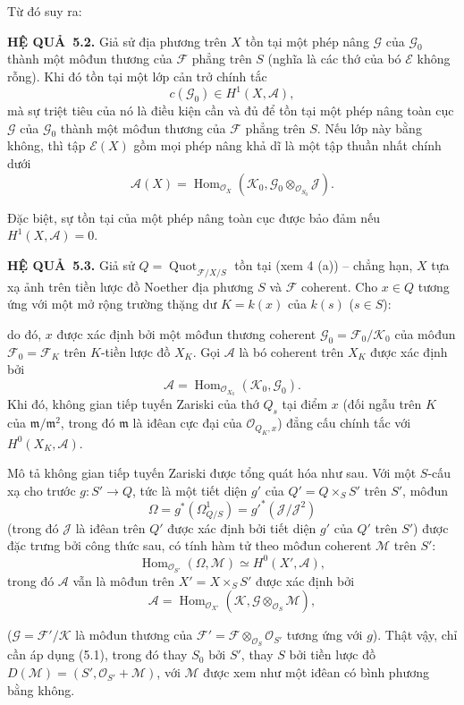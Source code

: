 \documentclass[11pt,twoside,openany]{book}
\numberwithin{equation}{section}
\newcommand{\src}[1]{%
  \phantomsection\hypertarget{src:\fgasourceid:#1}{}%
  \marginpar{\raggedleft\footnotesize\sffamily #1}%
}
\newcommand{\fgasourceid}{unset}
\newcommand{\result}[2]{\par\medskip\noindent\textbf{#1\if\relax\detokenize{#2}\relax\else\ #2\fi.}\quad}
\begin{document}
Từ đó suy ra:

\result{HỆ QUẢ}{5.2} Giả sử địa phương trên $X$ tồn tại một phép nâng
$\mathcal G$ của $\mathcal G_0$ thành một môđun thương của $\mathcal F$ phẳng
trên $S$ (nghĩa là các thớ của bó $\mathcal E$ không rỗng). Khi đó tồn tại một
lớp cản trở chính tắc
\[
c(\mathcal G_0)\in H^1(X,\mathcal A),
\]
mà sự triệt tiêu của nó là điều kiện cần và đủ để tồn tại một phép nâng toàn
cục $\mathcal G$ của $\mathcal G_0$ thành một môđun thương của $\mathcal F$
phẳng trên $S$. Nếu lớp này bằng không, thì tập $\mathcal E(X)$ gồm mọi phép
nâng khả dĩ là một tập thuần nhất chính dưới
\[
\mathcal A(X)=\operatorname{Hom}_{\mathcal O_X}
(\mathcal K_0,\mathcal G_0\otimes_{\mathcal O_{S_0}}\mathcal J).
\]

Đặc biệt, sự tồn tại của một phép nâng toàn cục được bảo đảm nếu
$H^1(X,\mathcal A)=0$.

\result{HỆ QUẢ}{5.3} Giả sử
$Q=\operatorname{Quot}_{\mathcal F/X/S}$ tồn tại (xem 4 (a)) -- chẳng hạn,
$X$ tựa xạ ảnh trên tiền lược đồ Noether địa phương $S$ và $\mathcal F$ coherent. Cho
$x\in Q$ tương ứng với một mở rộng trường thặng dư $K=k(x)$ của $k(s)$
($s\in S$):
\src{270}
do đó, $x$ được xác định bởi một môđun thương coherent
$\mathcal G_0=\mathcal F_0/\mathcal K_0$ của môđun
$\mathcal F_0=\mathcal F_K$ trên $K$-tiền lược đồ $X_K$. Gọi $\mathcal A$ là
bó coherent trên $X_K$ được xác định bởi
\[
\mathcal A=\operatorname{Hom}_{\mathcal O_{X_0}}(\mathcal K_0,\mathcal G_0).
\]
Khi đó, không gian tiếp tuyến Zariski của thớ $Q_s$ tại điểm $x$ (đối ngẫu trên
$K$ của $\mathfrak m/\mathfrak m^2$, trong đó $\mathfrak m$ là iđêan cực đại
của $\mathcal O_{Q_K,x}$) đẳng cấu chính tắc với $H^0(X_K,\mathcal A)$.

Mô tả không gian tiếp tuyến Zariski được tổng quát hóa như sau. Với một
$S$-cấu xạ cho trước $g:S'\longrightarrow Q$, tức là một tiết diện $g'$ của
$Q'=Q\times_SS'$ trên $S'$, môđun
\[
\Omega=g^*(\Omega^1_{Q/S})=g'^*(\mathcal J/\mathcal J^2)
\]
(trong đó $\mathcal J$ là iđêan trên $Q'$ được xác định bởi tiết diện $g'$ của
$Q'$ trên $S'$) được đặc trưng bởi công thức sau, có tính hàm tử theo môđun coherent
$\mathcal M$ trên $S'$:
\[
\operatorname{Hom}_{\mathcal O_{S'}}(\Omega,\mathcal M)
\simeq H^0(X',\mathcal A),
\]
trong đó $\mathcal A$ vẫn là môđun trên $X'=X\times_SS'$ được xác định bởi
\[
\mathcal A=\operatorname{Hom}_{\mathcal O_{X'}}
(\mathcal K,\mathcal G\otimes_{\mathcal O_S}\mathcal M),
\]

($\mathcal G=\mathcal F'/\mathcal K$ là môđun thương của
$\mathcal F'=\mathcal F\otimes_{\mathcal O_S}\mathcal O_{S'}$ tương ứng với
$g$). Thật vậy, chỉ cần áp dụng (5.1), trong đó thay $S_0$ bởi $S'$, thay $S$
bởi tiền lược đồ $D(\mathcal M)=(S',\mathcal O_{S'}+\mathcal M)$, với
$\mathcal M$ được xem như một iđêan có bình phương bằng không.
\end{document}
